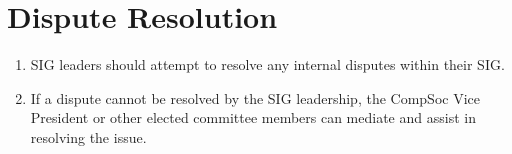\section{Dispute Resolution}
\begin{enumerate}
\item SIG leaders should attempt to resolve any internal disputes within their SIG.
\item If a dispute cannot be resolved by the SIG leadership, the CompSoc Vice President or other elected committee members can mediate and assist in resolving the issue.
\end{enumerate}
